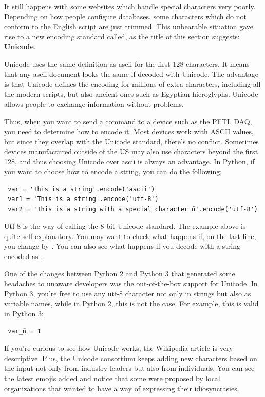 It still happens with some websites which handle special characters very poorly. Depending on how people configure databases, some characters which do not conform to the English script are just trimmed. This unbearable situation gave rise to a new encoding standard called, as the title of this section suggests: \textbf{Unicode}.

Unicode uses the same definition as ascii for the first 128 characters. It means that any ascii document looks the same if decoded with Unicode. The advantage is that Unicode defines the encoding for millions of extra characters, including all the modern scripts, but also ancient ones such as Egyptian hieroglyphs. Unicode allows people to exchange information without problems.

Thus, when you want to send a command to a device such as the {PFTL DAQ}, you need to determine how to encode it. Most devices work with ASCII values, but since they overlap with the Unicode standard, there's no conflict. Sometimes devices manufactured outside of the US may also use characters beyond the first 128, and thus choosing Unicode over ascii is always an advantage. In Python, if you want to choose how to encode a string, you can do the following:

\begin{verbatim}
 var = 'This is a string'.encode('ascii')
 var1 = 'This is a string'.encode('utf-8')
 var2 = 'This is a string with a special character ñ'.encode('utf-8')
\end{verbatim}

Utf-8 is the way of calling the 8-bit Unicode standard. The example above is quite self-explanatory. You may want to check what happens if, on the last line, you change  by . You can also see what happens if you decode with  a string encoded as .

One of the changes between Python 2 and Python 3 that generated some headaches to unaware developers was the out-of-the-box support for Unicode. In Python 3, you're free to use any utf-8 character not only in strings but also as variable names, while in Python 2, this is not the case. For example, this is valid in Python 3:

\begin{verbatim}
 var_ñ = 1
\end{verbatim}

If you're curious to see how Unicode works, the Wikipedia article is very descriptive. Plus, the Unicode consortium keeps adding new characters based on the input not only from industry leaders but also from individuals. You can see the latest emojis added and notice that some were proposed by local organizations that wanted to have a way of expressing their idiosyncrasies.
